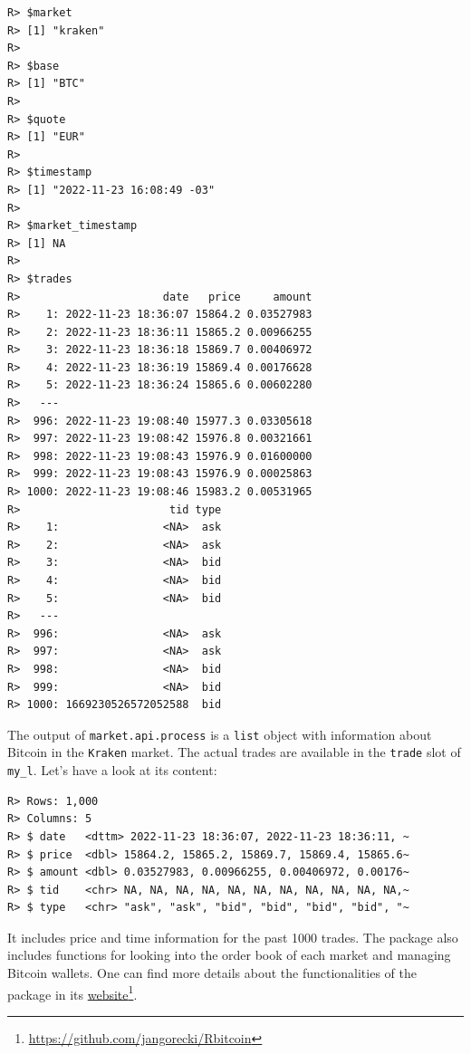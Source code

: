 \documentclass[
  12pt,
]{book}
\newenvironment{Shaded}{\begin{snugshade}}{\end{snugshade}}
\newcommand{\FunctionTok}[1]{\textcolor[rgb]{0,0,0}{#1}}
\newcommand{\NormalTok}[1]{#1}
\newcommand{\SpecialCharTok}[1]{\textcolor[rgb]{0,0,0}{#1}}
\begin{document}
\begin{verbatim}
R> $market
R> [1] "kraken"
R> 
R> $base
R> [1] "BTC"
R> 
R> $quote
R> [1] "EUR"
R> 
R> $timestamp
R> [1] "2022-11-23 16:08:49 -03"
R> 
R> $market_timestamp
R> [1] NA
R> 
R> $trades
R>                      date   price     amount
R>    1: 2022-11-23 18:36:07 15864.2 0.03527983
R>    2: 2022-11-23 18:36:11 15865.2 0.00966255
R>    3: 2022-11-23 18:36:18 15869.7 0.00406972
R>    4: 2022-11-23 18:36:19 15869.4 0.00176628
R>    5: 2022-11-23 18:36:24 15865.6 0.00602280
R>   ---                                       
R>  996: 2022-11-23 19:08:40 15977.3 0.03305618
R>  997: 2022-11-23 19:08:42 15976.8 0.00321661
R>  998: 2022-11-23 19:08:43 15976.9 0.01600000
R>  999: 2022-11-23 19:08:43 15976.9 0.00025863
R> 1000: 2022-11-23 19:08:46 15983.2 0.00531965
R>                       tid type
R>    1:                <NA>  ask
R>    2:                <NA>  ask
R>    3:                <NA>  bid
R>    4:                <NA>  bid
R>    5:                <NA>  bid
R>   ---                         
R>  996:                <NA>  ask
R>  997:                <NA>  ask
R>  998:                <NA>  bid
R>  999:                <NA>  bid
R> 1000: 1669230526572052588  bid
\end{verbatim}

The output of \texttt{market.api.process} is a \texttt{list} object with information about Bitcoin in the \texttt{\textquotesingle{}Kraken\textquotesingle{}} market. The actual trades are available in the \texttt{trade} slot of \texttt{my\_l}. Let's have a look at its content:

\begin{Shaded}
\end{Shaded}

\begin{verbatim}
R> Rows: 1,000
R> Columns: 5
R> $ date   <dttm> 2022-11-23 18:36:07, 2022-11-23 18:36:11, ~
R> $ price  <dbl> 15864.2, 15865.2, 15869.7, 15869.4, 15865.6~
R> $ amount <dbl> 0.03527983, 0.00966255, 0.00406972, 0.00176~
R> $ tid    <chr> NA, NA, NA, NA, NA, NA, NA, NA, NA, NA, NA,~
R> $ type   <chr> "ask", "ask", "bid", "bid", "bid", "bid", "~
\end{verbatim}

It includes price and time information for the past 1000 trades. The package also includes functions for looking into the order book of each market and managing Bitcoin wallets. One can find more details about the functionalities of the package in its \href{https://github.com/jangorecki/Rbitcoin}{website}\footnote{\url{https://github.com/jangorecki/Rbitcoin}}.
\end{document}
